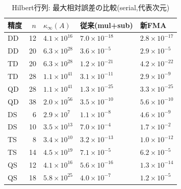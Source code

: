 \documentclass[a4j,dvipdfmx,11pt]{jsarticle}
\begin{document}
\begin{table}[htbp]
\centering
\caption{Hilbert行列: 最大相対誤差の比較(serial,代表次元)}
\label{tab:illhilbert}
\small
\begin{tabular}{lrlll}
\toprule
精度 & $n$ & $\kappa_\infty(A)$ & 従来(mul+sub) & 新FMA \\
\midrule
DD & 12 & $4.1\times10^{16}$ & $7.0\times10^{-18}$ & $2.8\times10^{-17}$ \\
DD & 20 & $6.3\times10^{28}$ & $3.6\times10^{-5}$ & $2.9\times10^{-5}$ \\
TD & 20 & $6.3\times10^{28}$ & $1.2\times10^{-21}$ & $4.2\times10^{-22}$ \\
TD & 28 & $1.1\times10^{41}$ & $3.1\times10^{-11}$ & $2.9\times10^{-9}$ \\
QD & 28 & $1.1\times10^{41}$ & $1.3\times10^{-25}$ & $3.3\times10^{-25}$ \\
QD & 38 & $2.0\times10^{56}$ & $3.5\times10^{-10}$ & $5.6\times10^{-10}$ \\
DS & 6 & $2.9\times10^{7}$ & $1.1\times10^{-8}$ & $4.6\times10^{-9}$ \\
DS & 10 & $3.5\times10^{13}$ & $7.0\times10^{-4}$ & $1.7\times10^{-2}$ \\
TS & 8 & $3.4\times10^{10}$ & $3.2\times10^{-13}$ & $1.0\times10^{-12}$ \\
TS & 14 & $4.5\times10^{19}$ & $7.1\times10^{-5}$ & $6.2\times10^{-5}$ \\
QS & 12 & $4.1\times10^{16}$ & $5.6\times10^{-16}$ & $1.3\times10^{-14}$ \\
QS & 18 & $5.8\times10^{25}$ & $4.0\times10^{-7}$ & $1.2\times10^{-5}$ \\
\bottomrule
\end{tabular}
\end{table}
\end{document}
